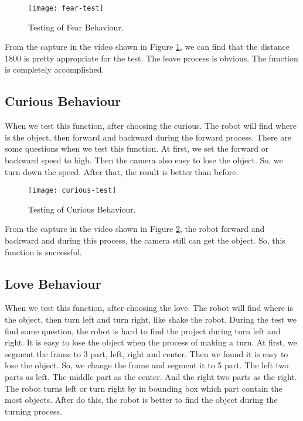 \begin{figure}
\centering
\texttt{[image: fear-test]}
\caption{Testing of Fear Behaviour.}
\label{fig:fear-test}
\end{figure}

From the capture in the video shown in Figure \ref{fig:fear-test}, we can find that the distance 1800 is pretty appropriate for the test. The leave process is obvious. The function is completely accomplished.

\subsection{Curious Behaviour}

When we test this function, after choosing the curious. The robot will find where is the object, then forward and backward during the forward process. There are some questions when we test this function. At first, we set the forward or backward speed to high. Then the camera also easy to lose the object. So, we turn down the speed. After that, the result is better than before.

\begin{figure}
\centering
\texttt{[image: curious-test]}
\caption{Testing of Curious Behaviour.}
\label{fig:curious-test}
\end{figure}

From the capture in the video shown in Figure \ref{fig:curious-test}, the robot forward and backward and during this process, the camera still can get the object. So, this function is successful.


\subsection{Love Behaviour}


When we test this function, after choosing the love. The robot will find where is the object, then turn left and turn right, like shake the robot. During the test we find some question, the robot is hard to find the project during turn left and right. It is easy to lose the object when the process of making a turn. At first, we segment the frame to 3 part, left, right and center. Then we found it is easy to lose the object. So, we change the frame and segment it to 5 part. The left two parts as left. The middle part as the center. And the right two parts as the right. The robot turns left or turn right by in bounding box which part contain the most objects. After do this, the robot is better to find the object during the turning process.


